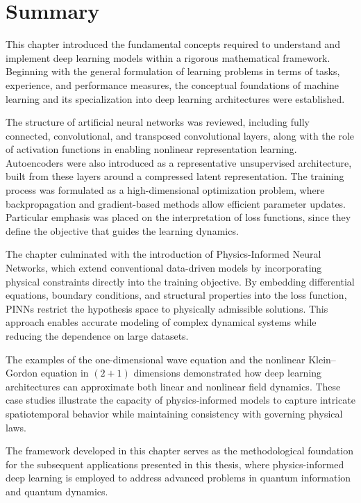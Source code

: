 \section{Summary}
\label{sec:dl_summary}

This chapter introduced the fundamental concepts required to understand and implement deep learning models within a rigorous mathematical framework. Beginning with the general formulation of learning problems in terms of tasks, experience, and performance measures, the conceptual foundations of machine learning and its specialization into deep learning architectures were established.

The structure of artificial neural networks was reviewed, including fully connected, convolutional, and transposed convolutional layers, along with the role of activation functions in enabling nonlinear representation learning. Autoencoders were also introduced as a representative unsupervised architecture, built from these layers around a compressed latent representation. The training process was formulated as a high-dimensional optimization problem, where backpropagation and gradient-based methods allow efficient parameter updates. Particular emphasis was placed on the interpretation of loss functions, since they define the objective that guides the learning dynamics.

The chapter culminated with the introduction of Physics-Informed Neural Networks, which extend conventional data-driven models by incorporating physical constraints directly into the training objective. By embedding differential equations, boundary conditions, and structural properties into the loss function, PINNs restrict the hypothesis space to physically admissible solutions. This approach enables accurate modeling of complex dynamical systems while reducing the dependence on large datasets.

The examples of the one-dimensional wave equation and the nonlinear Klein--Gordon equation in $(2+1)$ dimensions demonstrated how deep learning architectures can approximate both linear and nonlinear field dynamics. These case studies illustrate the capacity of physics-informed models to capture intricate spatiotemporal behavior while maintaining consistency with governing physical laws.

The framework developed in this chapter serves as the methodological foundation for the subsequent applications presented in this thesis, where physics-informed deep learning is employed to address advanced problems in quantum information and quantum dynamics.